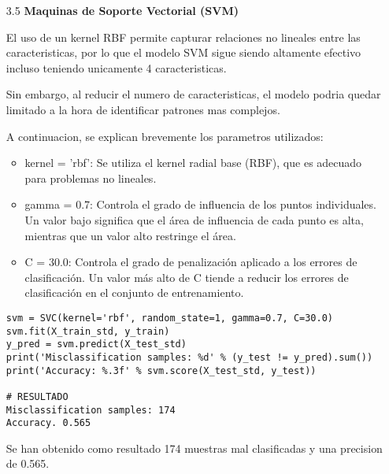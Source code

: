 \documentclass{article}
\begin{document}
\bigskip

\begin{itemize}

\item[3.5]  {\bf Maquinas de Soporte Vectorial (SVM)}

El uso de un kernel RBF permite capturar relaciones no lineales entre las caracteristicas, por lo que el modelo SVM sigue siendo altamente efectivo incluso teniendo unicamente 4 caracteristicas.

Sin embargo, al reducir el numero de caracteristicas, el modelo podria quedar limitado a la hora de identificar patrones mas complejos.

A continuacion, se explican brevemente los parametros utilizados:

\begin{itemize}

\item
kernel = 'rbf': Se utiliza el kernel radial base (RBF), que es adecuado para problemas no lineales.

\item
gamma = 0.7: Controla el grado de influencia de los puntos individuales. Un valor bajo significa que el área de influencia de cada punto es alta, mientras que un valor alto restringe el área.

\item
C = 30.0: Controla el grado de penalización aplicado a los errores de clasificación. Un valor más alto de C tiende a reducir los errores de clasificación en el conjunto de entrenamiento.

\end{itemize}

\begin{tcolorbox}[width=14cm]
\begin{scriptsize}
\begin{verbatim}
svm = SVC(kernel='rbf', random_state=1, gamma=0.7, C=30.0)
svm.fit(X_train_std, y_train)
y_pred = svm.predict(X_test_std)
print('Misclassification samples: %d' % (y_test != y_pred).sum())
print('Accuracy: %.3f' % svm.score(X_test_std, y_test))

# RESULTADO
Misclassification samples: 174
Accuracy. 0.565
\end{verbatim}
\end{scriptsize}
\end{tcolorbox}

Se han obtenido como resultado 174 muestras mal clasificadas y una precision de 0.565.

\end{itemize}
\end{document}
